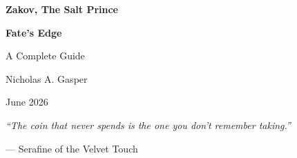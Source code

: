 \begin{titlepage}
\centering
\vspace*{1cm}

{\Huge\bfseries Zakov, The Salt Prince\par}
\vspace{0.3cm}
{\Large\bfseries Fate's Edge\par}
\vspace{0.5cm}
{\large A Complete Guide\par}
\vspace{2cm}

{\large Nicholas A. Gasper\par}
\vspace{0.3cm}
{\large June 2026\par}

\vfill
{\large \textit{``The coin that never spends is the one you don't remember taking.''}\par}
\vspace{0.2cm}
{\large --- Serafine of the Velvet Touch\par}

\end{titlepage}
